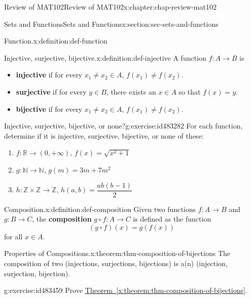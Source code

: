 \documentclass[oneside,10pt,]{book}
\newcommand{\xreffont}{\relax}
\newcommand{\terminology}[1]{\textbf{#1}}
\numberwithin{equation}{section}
\begin{document}
\begin{chapterptx}{Review of MAT102}{}{Review of MAT102}{}{}{x:chapter:chap-review-mat102}
\begin{sectionptx}{Sets and Functions}{}{Sets and Functions}{}{}{x:section:sec-sets-and-functions}
\begin{definition}{Function.}{x:definition:def-function}
\end{definition}
\begin{definition}{Injective, surjective, bijective.}{x:definition:def-injective}%
A function \(f: A \rightarrow B\) is%
\begin{itemize}[label=\textbullet]
\item{}\terminology{injective} if for every \(x_1 \ne x_2 \in A\), \(f(x_1) \ne f(x_2)\).%
\item{}\terminology{surjective} if for every \(y \in B\), there exists an \(x \in A\) so that \(f(x) = y\).%
\item{}\terminology{bijective} if for every \(x_1 \ne x_2 \in A\), \(f(x_1) \ne f(x_2)\).%
\end{itemize}
%
\end{definition}
\begin{inlineexercise}{Injective, surjective, bijective, or none?}{g:exercise:id483282}%
For each function, determine if it is injective, surjective, bijective, or none of these:%
%
\begin{enumerate}[label=(\alph*)]
\item{}\(f: \mathbb{R} \rightarrow (0,+\infty)\), \(f(x) = \sqrt{x^2+1}\)%
\item{}\(g: \mathbb{N} \rightarrow \mathbb{N}\), \(g(m) = 3m + 7m^2\)%
\item{}\(h: \mathbb{Z} \times \mathbb{Z} \rightarrow \mathbb{Z}\), \(h(a,b) = \dfrac{ab(b-1)}{2}\)%
\end{enumerate}
\end{inlineexercise}
\begin{definition}{Composition.}{x:definition:def-composition}%
\label{g:notation:id483342} Given two functions \(f: A \rightarrow B\) and \(g: B \rightarrow C\), the \terminology{composition} \(g \circ f: A \rightarrow C\) is defined as the function%
\begin{equation*}
(g \circ f)(x) = g(f(x))
\end{equation*}
for all \(x \in A\).%
\end{definition}
\begin{theorem}{Properties of Compositions.}{}{x:theorem:thm-composition-of-bijections}%
The composition of two (injections, surjections, bijections) is a(n) (injection, surjection, bijection).%
\end{theorem}
\begin{inlineexercise}{}{g:exercise:id483459}%
Prove \hyperref[x:theorem:thm-composition-of-bijections]{Theorem~{\xreffont\ref{x:theorem:thm-composition-of-bijections}}}.%

\end{inlineexercise}
\end{sectionptx}
\end{chapterptx}
\end{document}
